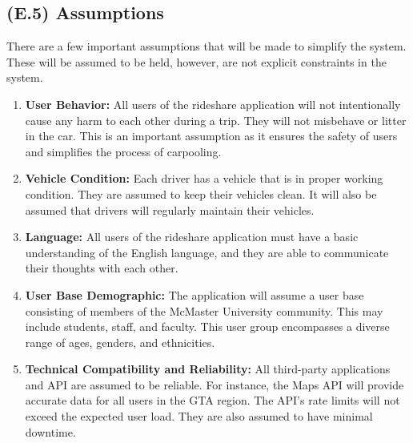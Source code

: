 \documentclass[12pt,letterpaper]{article}
\begin{document}
\subsection{(E.5) Assumptions}
There are a few important assumptions that will be made to simplify the system. These will be assumed to be held, however, are not explicit constraints in the system.  
\begin{enumerate}
\item \textbf{User Behavior:} All users of the rideshare application will not intentionally cause any harm to each other during a trip. They will not misbehave or litter in the car. This is an important assumption as it ensures the safety of users and simplifies the process of carpooling.  
\item \textbf{Vehicle Condition:} Each driver has a vehicle that is in proper working condition. They are assumed to keep their vehicles clean. It will also be assumed that drivers will regularly maintain their vehicles.
\item \textbf{Language:} All users of the rideshare application must have a basic understanding of the English language, and they are able to communicate their thoughts with each other.
\item \textbf{User Base Demographic:} The application will assume a user base consisting of members of the McMaster University community. This may include students, staff, and faculty. This user group encompasses a diverse range of ages, genders, and ethnicities.
\item \textbf{Technical Compatibility and Reliability:} All third-party applications and API are assumed to be reliable. For instance, the Maps API will provide accurate data for all users in the GTA region. The API's rate limits will not exceed the expected user load. They are also assumed to have minimal downtime. 
\end{enumerate}
\end{document}
